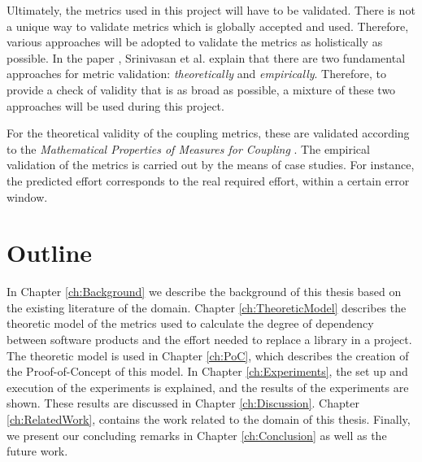 Ultimately, the metrics used in this project will have to be validated. There is not a unique way to validate metrics which is globally accepted and used. Therefore, various approaches will be adopted to validate the metrics as holistically as possible. In the paper \cite{srinivasan2014software}, Srinivasan et al. explain that there are two fundamental approaches for metric validation: \textit{theoretically} and \textit{empirically}. Therefore, to provide a check of validity that is as broad as possible, a mixture of these two approaches will be used during this project.

For the theoretical validity of the coupling metrics, these are validated according to the \textit{Mathematical Properties of Measures for Coupling} \cite{srinivasan2014software}.
The empirical validation of the metrics is carried out by the means of case studies. For instance, the predicted effort corresponds to the real required effort, within a certain error window. 

\section{Outline}
In Chapter \ref{ch:Background} we describe the background of this thesis based on the existing literature of the domain.
Chapter \ref{ch:TheoreticModel} describes the theoretic model of the metrics used to calculate the degree of dependency between software products and the effort needed to replace a library in a project.
The theoretic model is used in Chapter \ref{ch:PoC}, which describes the creation of the Proof-of-Concept of this model.
In Chapter \ref{ch:Experiments}, the set up and execution of the experiments is explained, and the results of the experiments are shown. These results are discussed in Chapter \ref{ch:Discussion}. Chapter \ref{ch:RelatedWork}, contains the work related to the domain of this thesis.
Finally, we present our concluding remarks in Chapter \ref{ch:Conclusion} as well as the future work.
